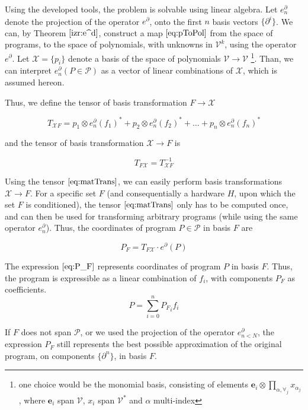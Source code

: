 \documentclass[smallcondensed]{svjour3}
\newcommand{\VV}{\mathcal{V}}
\newcommand{\e}{\mathbf{e}}
\newcommand{\X}{\mathcal{X}}
\newcommand{\dP}{\mathcal{P}}
\newcommand{\D}{\partial}
\begin{document}
   Using the developed tools, the problem is solvable using linear algebra. Let
   $e^\D_n$ denote the projection of the operator $e^\D$, onto the first $n$
   basis vectors $\{\D^i\}$. We can, by Theorem $\ref{izr:e^d}$, construct a map
   $\eqref{eq:pToPol}$ from the space of programs, to the space of polynomials,
   with unknowns in $\VV^k$, using the operator $e^\D$. Let $\X=\{p_i\}$ denote a basis of
   the space of polynomials $\VV\to \VV$ \footnote{one choice would be the monomial basis,
   consisting of elements $\e_i\otimes\prod\limits_{\alpha,\forall_j}
   x_{\alpha_j}$, where $\e_i$ span $\VV$, $x_i$ span $\VV^*$ and $\alpha$
   multi-index}. Than, we can interpret $e^\D_n(P\in\dP)$ as a vector of linear combinations of $\X$, which is assumed hereon.
  
  Thus, we define the tensor of basis transformation $F\to\X$
  
  \begin{equation}\label{eq:matTransF}
  T_{\X F}=
  p_1\otimes e_n^\D(f_1)^* + p_2\otimes e_n^\D(f_2)^* + \ldots + p_n\otimes e_n^\D(f_n)^*
  \end{equation}
  
  and the tensor of basis transformation $\X\to F$ is
  
  \begin{equation}\label{eq:matTrans}
  T_{F\X}=T_{\X F}^{-1}
  \end{equation}
  
  Using the tensor $\eqref{eq:matTrans}$, we can easily perform basis transformations $\X\to F$. For a specific set $F$ (and consequentially a hardware $H$, upon which the set $F$ is conditioned), the tensor $\eqref{eq:matTrans}$ only has to be computed once, and can then be used for transforming arbitrary programs (while using the same operator $e^\D_n$).
  Thus, the coordinates of program $P\in\dP$ in basis $F$ are
  
  \begin{equation}\label{eq:P_F}
  	P_F=T_{F\X}\cdot e^\D(P)
  \end{equation}
  
  The expression $\eqref{eq:P_F}$ represents coordinates of program $P$ in basis $F$. Thus, the program is expressible as a linear combination of $f_i$, with components $P_F$ as coefficients.
  \begin{equation}
  P=\sum\limits_{i=0}^{n}{P_F}_if_i
  \end{equation}
  
  If $F$ does not span $\dP$, or we used the projection of the operator $e^\D_{n<N}$, the expression $P_F$ still represents the best possible approximation of the original program, on components $\{\D^n\}$, in basis $F$.
  
\end{document}

